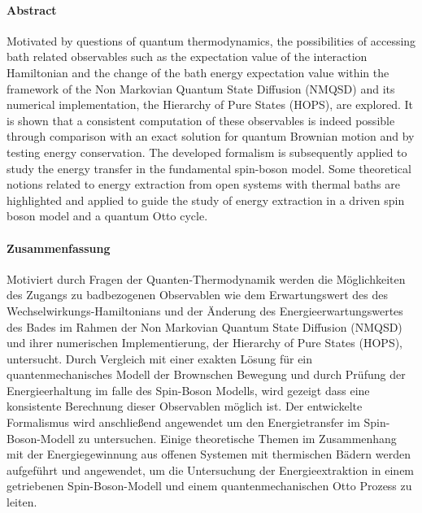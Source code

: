 \paragraph{Abstract}

Motivated by questions of quantum thermodynamics, the possibilities of
accessing bath related observables such as the expectation value of
the interaction Hamiltonian and the change of the bath energy
expectation value within the framework of the Non Markovian Quantum
State Diffusion (NMQSD) and its numerical implementation, the
Hierarchy of Pure States (HOPS), are explored. It is shown that a
consistent computation of these observables is indeed possible through
comparison with an exact solution for quantum Brownian motion and by
testing energy conservation.  The developed formalism is subsequently
applied to study the energy transfer in the fundamental spin-boson
model. Some theoretical notions related to energy extraction from open
systems with thermal baths are highlighted and applied to guide the
study of energy extraction in a driven spin boson model and a quantum
Otto cycle.


\paragraph{Zusammenfassung}


Motiviert durch Fragen der Quanten-Thermodynamik werden die
Möglichkeiten des Zugangs zu badbezogenen Observablen wie dem
Erwartungswert des des Wechselwirkungs-Hamiltonians und der Änderung
des Energieerwartungswertes des Bades im Rahmen der Non Markovian
Quantum State Diffusion (NMQSD) und ihrer numerischen Implementierung,
der Hierarchy of Pure States (HOPS), untersucht.  Durch Vergleich mit
einer exakten Lösung für ein quantenmechanisches Modell der Brownschen
Bewegung und durch Prüfung der Energieerhaltung im falle des
Spin-Boson Modells, wird gezeigt dass eine konsistente Berechnung
dieser Observablen möglich ist.  Der entwickelte Formalismus wird
anschließend angewendet um den Energietransfer im Spin-Boson-Modell zu
untersuchen. Einige theoretische Themen im Zusammenhang mit der
Energiegewinnung aus offenen Systemen mit thermischen Bädern werden
aufgef\"uhrt und angewendet, um die Untersuchung der Energieextraktion
in einem getriebenen Spin-Boson-Modell und einem quantenmechanischen
Otto Prozess zu leiten.
